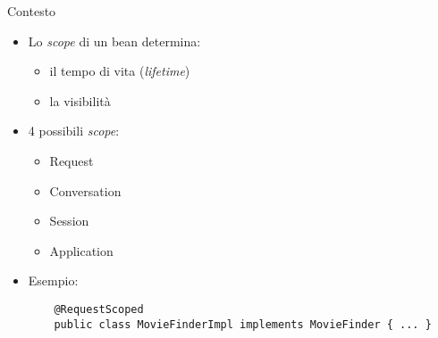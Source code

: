 \begin{frame}[fragile]{Contesto}

\begin{itemize}
\item Lo \textsl{scope} di un bean determina:

	\begin{itemize}
	
	\vspace{0.3em}
	
	\item il tempo di vita (\textsl{lifetime})
	
	\vspace{0.5em}
	
	\item la visibilità
	\end{itemize}

\vspace{0.7em}

\item 4 possibili \textsl{scope}:
	\begin{itemize}
	
	\vspace{0.3em}
	
	\item Request
	
	\vspace{0.5em}
	
	\item Conversation
	
	\vspace{0.5em}
	
	\item Session
	
	\vspace{0.5em}
	
	\item Application
	\end{itemize}
	
\vspace{0.7em}

\item Esempio:
	\begin{lstlisting}
	@RequestScoped
	public class MovieFinderImpl implements MovieFinder { ... }
	\end{lstlisting}

\end{itemize}

\end{frame}



